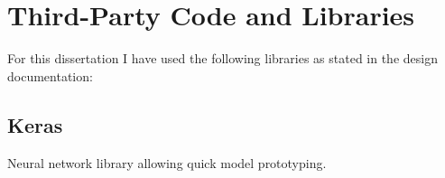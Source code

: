 \chapter{Third-Party Code and Libraries}

For this dissertation I have used the following libraries as stated in the design documentation:

\section{Keras}
Neural network library allowing quick model prototyping.\cite{chollet2015keras}